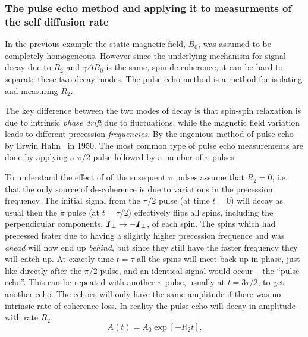 \documentclass[11pt,a4paper, twocolumn,
swedish, english %
]{article}
\begin{document}
\subsubsection{The pulse echo method and applying it to
measurments of the self diffusion rate} 

In the previous example the static magnetic field, $B_0$, was assumed
to be completely homogeneous. However since the underlying mechanism
for signal decay due to $R_2$ and $\gamma\Delta B_0$ is the same, spin
de-coherence, it can be hard to separate these two decay modes. The
pulse echo method is a method for isolating  and measuring $R_2$. 

The key difference between the two modes of decay is that spin-spin
relaxation is due to intrinsic \emph{phase drift} due to fluctuations,
while the magnetic field variation leads to different precession
\emph{frequencies}. By the ingenious method of pulse echo by Erwin
Hahn~\cite{Hahn1950} in 1950. The most common type of pulse echo
measurements are done by applying a $\pi/2$ pulse followed by a number
of $\pi$ pulses.

To understand the effect of of the susequent $\pi$ pulses assume that
$R_2=0$, i.e. that the only source of de-coherence is due to
variations in the precession frequency. The initial signal from the
$\pi/2$ pulse (at time $t=0$) will decay as usual then the $\pi$ pulse
(at $t=\tau/2$) effectively flips all spins, including the
perpendicular components, $\vb*I_\perp\to-\vb*I_\perp$, of each
spin. The spins which had precessed fsater due to having a slightly
higher precession frequence and was \emph{ahead} will now end up
\emph{behind}, but since they still have the faster frequency they
will catch up. At exactly time $t=\tau$ all the spins will meet
back up in phase, just like directly after the $\pi/2$ pulse, and an
identical signal would occur -- the ``pulse echo''. This can be
repeated with another $\pi$ pulse, usually at $t=3\tau/2$, to get
another echo. The echoes will only have the same amplitude if there
was no intrinsic rate of coherence loss. In reality the pulse echo
will decay in amplitude with rate $R_2$,
\begin{equation}
A(t)=A_0\exp[-R_2t].
\end{equation}
\end{document}
